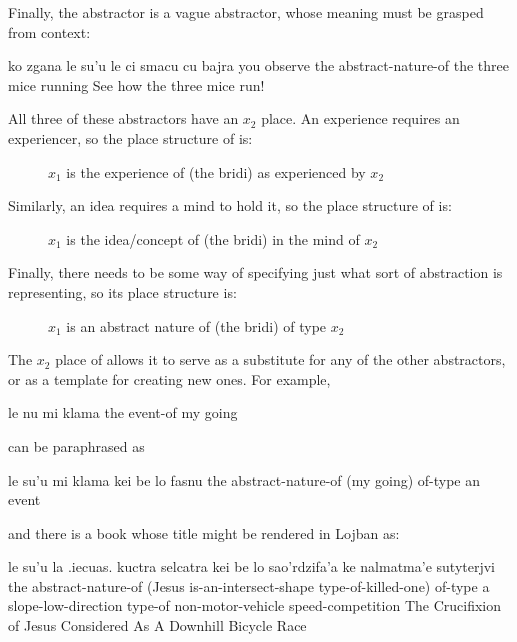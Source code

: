 Finally, the abstractor  is a vague abstractor, whose
    meaning must be grasped from context:
\begin{example}
ko zgana le su'u\n
\T	le ci smacu cu bajra\n
you  observe the abstract-nature-of\n
\T	the three mice running\n
See how the three mice run!
\end{example}

All three of these abstractors have an $x_2$ place. An experience
    requires an experiencer, so the place structure of  is:
\begin{description}
\item[] $x_1$ is the experience of (the bridi) as experienced by $x_2$
\end{description}

Similarly, an idea requires a mind to hold it, so the place
    structure of  is: 
\begin{description}
\item[] $x_1$ is the idea/concept of (the bridi) in the mind of $x_2$
\end{description}

Finally, there needs to be some way of specifying just what
    sort of abstraction  is representing, so its place
    structure is: 
\begin{description}
\item[] $x_1$ is an abstract nature of (the bridi) of type $x_2$
\end{description}

The $x_2$ place of  allows it to serve as a substitute for
    any of the other abstractors, or as a template for creating new
    ones. For example,
\begin{example}
le nu mi klama\n
the event-of my going
\end{example}

{\noindent}can be paraphrased as
\begin{example}
le su'u mi klama kei be lo fasnu\n
the abstract-nature-of (my going) of-type an event
\end{example}

{\noindent}and there is a book whose title might be rendered in Lojban as:
\begin{example}
le su'u la .iecuas. kuctra\n
\T	selcatra kei\n
\T	be lo sao'rdzifa'a\n
\T	ke nalmatma'e sutyterjvi\n
the abstract-nature-of (Jesus is-an-intersect-shape\n
\T	type-of-killed-one)\n
\T	of-type a slope-low-direction\n
\T	type-of non-motor-vehicle speed-competition\n
The Crucifixion of Jesus Considered As A\n
\T	Downhill Bicycle Race
\end{example}

